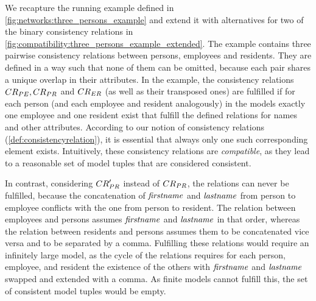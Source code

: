 We recapture the running example defined in \autoref{fig:networks:three_persons_example} and extend it with alternatives for two of the binary consistency relations in \autoref{fig:compatibility:three_persons_example_extended}.
The example contains three pairwise consistency relations between persons, employees and residents.
They are defined in a way such that none of them can be omitted, because each pair shares a unique overlap in their attributes.
In the example, the consistency relations $\consistencyrelation{CR}{PE}, \consistencyrelation{CR}{PR}$ and $\consistencyrelation{CR}{ER}$ (as well as their transposed ones) are fulfilled if for each person (and each employee and resident analogously) in the models exactly one employee and one resident exist that fulfill the defined relations for names and other attributes.
According to our notion of consistency relations (\autoref{def:consistencyrelation}), it is essential that always only one such corresponding element exists.
Intuitively, these consistency relations are \emph{compatible}, as they lead to a reasonable set of model tuples that are considered consistent.

In contrast, considering $\consistencyrelation{CR}{PR}'$ instead of $\consistencyrelation{CR}{PR}$, the relations can never be fulfilled, because the concatenation of $\mathit{firstname}$ and $\mathit{lastname}$ from person to employee conflicts with the one from person to resident.
The relation between employees and persons assumes $\mathit{firstname}$ and $\mathit{lastname}$ in that order, whereas the relation between residents and persons assumes them to be concatenated vice versa and to be separated by a comma.
Fulfilling these relations would require an infinitely large model, as the cycle of the relations requires for each person, employee, and resident the existence of the others with $\mathit{firstname}$ and $\mathit{lastname}$ swapped and extended with a comma.
As finite models cannot fulfill this, the set of consistent model tuples would be empty.


